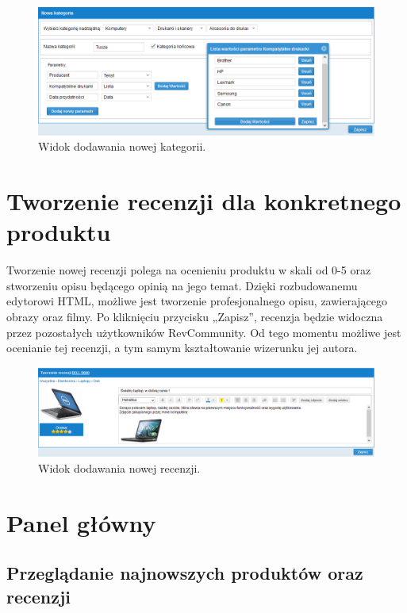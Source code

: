 \begin{figure}[h]
	\centering
	\includegraphics[width=1.00\textwidth]{images/nowa_kategoria.PNG}
	\caption{Widok dodawania nowej kategorii.}
\end{figure}
\newpage

\section{Tworzenie recenzji dla konkretnego produktu}

Tworzenie nowej recenzji polega na ocenieniu produktu w skali od 0-5 oraz stworzeniu opisu będącego opinią na jego temat. Dzięki rozbudowanemu edytorowi HTML, możliwe jest tworzenie profesjonalnego opisu, zawierającego obrazy oraz filmy. Po kliknięciu przycisku „Zapisz”, recenzja będzie widoczna przez pozostałych użytkowników RevCommunity. Od tego momentu możliwe jest ocenianie tej recenzji, a tym samym kształtowanie wizerunku jej autora.

\begin{figure}[h]
	\centering
	\includegraphics[width=1.00\textwidth]{images/nowa_recenzja.PNG}
	\caption{Widok dodawania nowej recenzji.}
\end{figure}

\section{Panel główny}

\subsection{Przeglądanie najnowszych produktów oraz recenzji}

